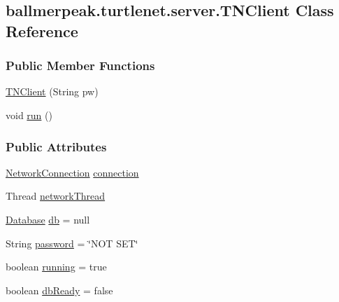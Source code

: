 \hypertarget{classballmerpeak_1_1turtlenet_1_1server_1_1TNClient}{\subsection{ballmerpeak.\-turtlenet.\-server.\-T\-N\-Client Class Reference}
\label{classballmerpeak_1_1turtlenet_1_1server_1_1TNClient}
}
\subsubsection*{Public Member Functions}
\begin{DoxyCompactItemize}
\item 
\hyperlink{classballmerpeak_1_1turtlenet_1_1server_1_1TNClient_ac4a0dada0133edeee842b9335c350454}{T\-N\-Client} (String pw)
\item 
void \hyperlink{classballmerpeak_1_1turtlenet_1_1server_1_1TNClient_adc8a19a614bf011afa7ca0e2435de031}{run} ()
\end{DoxyCompactItemize}
\subsubsection*{Public Attributes}
\begin{DoxyCompactItemize}
\item 
\hyperlink{classballmerpeak_1_1turtlenet_1_1server_1_1NetworkConnection}{Network\-Connection} \hyperlink{classballmerpeak_1_1turtlenet_1_1server_1_1TNClient_a5f3a2db779658358496e57ddc06ca612}{connection}
\item 
Thread \hyperlink{classballmerpeak_1_1turtlenet_1_1server_1_1TNClient_a30362e2dd295df5ecaadc7fed3374ea0}{network\-Thread}
\item 
\hyperlink{classballmerpeak_1_1turtlenet_1_1server_1_1Database}{Database} \hyperlink{classballmerpeak_1_1turtlenet_1_1server_1_1TNClient_a71515570b30a73fbd91017c811dad2ba}{db} = null
\item 
String \hyperlink{classballmerpeak_1_1turtlenet_1_1server_1_1TNClient_a9307f6efc05ddda37f9355b6f13953d9}{password} = \char`\"{}N\-O\-T S\-E\-T\char`\"{}
\item 
boolean \hyperlink{classballmerpeak_1_1turtlenet_1_1server_1_1TNClient_af8bbdf5ff58fedc8c99ef82b17654a94}{running} = true
\item 
boolean \hyperlink{classballmerpeak_1_1turtlenet_1_1server_1_1TNClient_aec7ed1884c5ebaaff15d83de15086ef2}{db\-Ready} = false
\end{DoxyCompactItemize}


